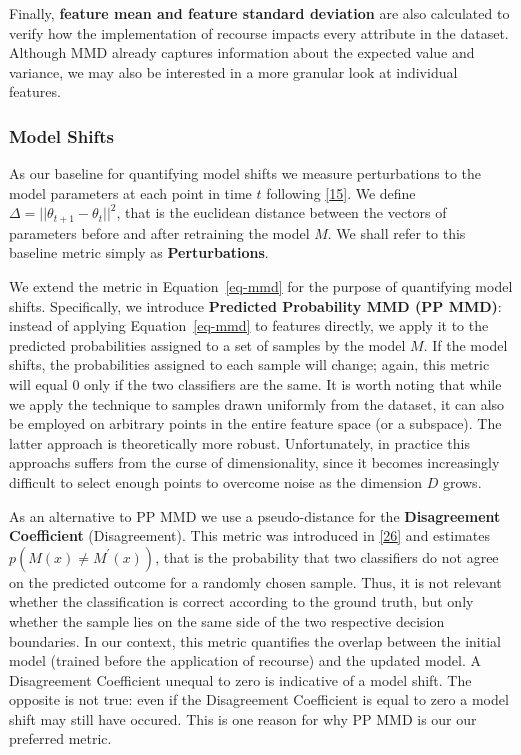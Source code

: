 \documentclass[
  conference]{IEEEtran}
\begin{document}
Finally, \textbf{feature mean and feature standard deviation} are also
calculated to verify how the implementation of recourse impacts every
attribute in the dataset. Although MMD already captures information
about the expected value and variance, we may also be interested in a
more granular look at individual features.

\hypertarget{model-shifts}{%
\subsubsection{Model Shifts}\label{model-shifts}}

As our baseline for quantifying model shifts we measure perturbations to
the model parameters at each point in time \(t\) following
\protect\hyperlink{ref-upadhyay2021towards}{{[}15{]}}. We define
\(\Delta=||\theta_{t+1}-\theta_{t}||^2\), that is the euclidean distance
between the vectors of parameters before and after retraining the model
\(M\). We shall refer to this baseline metric simply as
\textbf{Perturbations}.

We extend the metric in Equation~\ref{eq-mmd} for the purpose of
quantifying model shifts. Specifically, we introduce \textbf{Predicted
Probability MMD (PP MMD)}: instead of applying Equation~\ref{eq-mmd} to
features directly, we apply it to the predicted probabilities assigned
to a set of samples by the model \(M\). If the model shifts, the
probabilities assigned to each sample will change; again, this metric
will equal 0 only if the two classifiers are the same. It is worth
noting that while we apply the technique to samples drawn uniformly from
the dataset, it can also be employed on arbitrary points in the entire
feature space (or a subspace). The latter approach is theoretically more
robust. Unfortunately, in practice this approachs suffers from the curse
of dimensionality, since it becomes increasingly difficult to select
enough points to overcome noise as the dimension \(D\) grows.

As an alternative to PP MMD we use a pseudo-distance for the
\textbf{Disagreement Coefficient} (Disagreement). This metric was
introduced in \protect\hyperlink{ref-hanneke2007bound}{{[}26{]}} and
estimates \(p(M(x) \neq M^\prime(x))\), that is the probability that two
classifiers do not agree on the predicted outcome for a randomly chosen
sample. Thus, it is not relevant whether the classification is correct
according to the ground truth, but only whether the sample lies on the
same side of the two respective decision boundaries. In our context,
this metric quantifies the overlap between the initial model (trained
before the application of recourse) and the updated model. A
Disagreement Coefficient unequal to zero is indicative of a model shift.
The opposite is not true: even if the Disagreement Coefficient is equal
to zero a model shift may still have occured. This is one reason for why
PP MMD is our our preferred metric.
\end{document}
